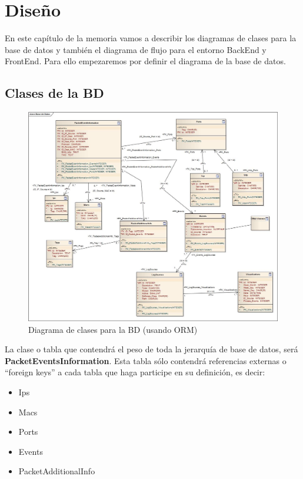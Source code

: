 \chapter{Diseño}
\label{chap:diseño}

En este capítulo de la memoria vamos a describir los diagramas de clases para la base de datos y también el diagrama de flujo para el entorno BackEnd y FrontEnd. Para ello empezaremos por definir el diagrama de la base de datos.

\section{Clases de la BD}

\begin{figure}[H]
\includegraphics[scale=.35]{diagramas/bd.jpg}
\caption{Diagrama de clases para la BD (usando ORM)}
\end{figure}

La clase o tabla que contendrá el peso de toda la jerarquía de base de datos, será \textbf{PacketEventsInformation}. Esta tabla sólo contendrá referencias externas o ``foreign keys'' a cada tabla que haga participe en su definición, es decir:
\begin{itemize}
\item Ips
\item Macs
\item Ports
\item Events
\item PacketAdditionalInfo
\end{itemize}

